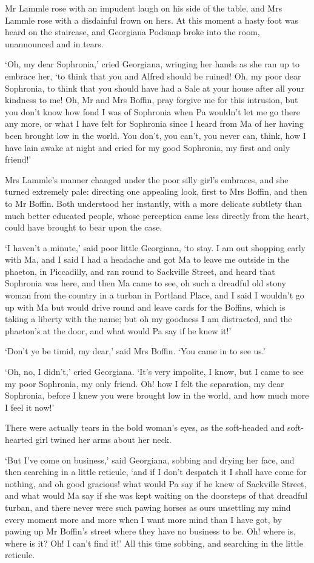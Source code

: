 Mr Lammle rose with an impudent laugh on his side of the table, and Mrs
Lammle rose with a disdainful frown on hers. At this moment a hasty foot
was heard on the staircase, and Georgiana Podsnap broke into the room,
unannounced and in tears.

‘Oh, my dear Sophronia,’ cried Georgiana, wringing her hands as she ran
up to embrace her, ‘to think that you and Alfred should be ruined! Oh,
my poor dear Sophronia, to think that you should have had a Sale at your
house after all your kindness to me! Oh, Mr and Mrs Boffin, pray forgive
me for this intrusion, but you don’t know how fond I was of Sophronia
when Pa wouldn’t let me go there any more, or what I have felt for
Sophronia since I heard from Ma of her having been brought low in the
world. You don’t, you can’t, you never can, think, how I have lain awake
at night and cried for my good Sophronia, my first and only friend!’

Mrs Lammle’s manner changed under the poor silly girl’s embraces, and
she turned extremely pale: directing one appealing look, first to Mrs
Boffin, and then to Mr Boffin. Both understood her instantly, with
a more delicate subtlety than much better educated people, whose
perception came less directly from the heart, could have brought to bear
upon the case.

‘I haven’t a minute,’ said poor little Georgiana, ‘to stay. I am out
shopping early with Ma, and I said I had a headache and got Ma to leave
me outside in the phaeton, in Piccadilly, and ran round to Sackville
Street, and heard that Sophronia was here, and then Ma came to see, oh
such a dreadful old stony woman from the country in a turban in Portland
Place, and I said I wouldn’t go up with Ma but would drive round and
leave cards for the Boffins, which is taking a liberty with the name;
but oh my goodness I am distracted, and the phaeton’s at the door, and
what would Pa say if he knew it!’

‘Don’t ye be timid, my dear,’ said Mrs Boffin. ‘You came in to see us.’

‘Oh, no, I didn’t,’ cried Georgiana. ‘It’s very impolite, I know, but
I came to see my poor Sophronia, my only friend. Oh! how I felt the
separation, my dear Sophronia, before I knew you were brought low in the
world, and how much more I feel it now!’

There were actually tears in the bold woman’s eyes, as the soft-headed
and soft-hearted girl twined her arms about her neck.

‘But I’ve come on business,’ said Georgiana, sobbing and drying her
face, and then searching in a little reticule, ‘and if I don’t despatch
it I shall have come for nothing, and oh good gracious! what would Pa
say if he knew of Sackville Street, and what would Ma say if she was
kept waiting on the doorsteps of that dreadful turban, and there never
were such pawing horses as ours unsettling my mind every moment more
and more when I want more mind than I have got, by pawing up Mr Boffin’s
street where they have no business to be. Oh! where is, where is it?
Oh! I can’t find it!’ All this time sobbing, and searching in the little
reticule.

